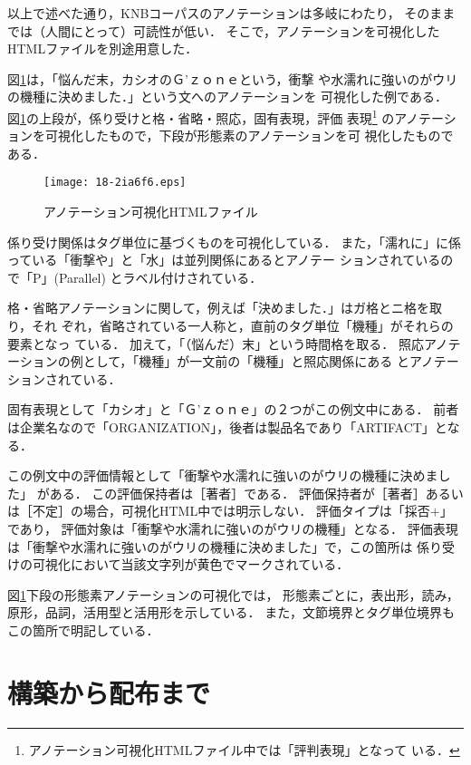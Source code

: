 \documentclass[japanese]{jnlp_JS2.0}
\begin{document}
以上で述べた通り，KNBコーパスのアノテーションは多岐にわたり，
そのままでは（人間にとって）可読性が低い．
そこで，アノテーションを可視化したHTMLファイルを別途用意した．

図\ref{fig:visualize}は，「悩んだ末，カシオのＧ’ｚｏｎｅという，衝撃
や水濡れに強いのがウリの機種に決めました．」という文へのアノテーションを
可視化した例である．
図\ref{fig:visualize}の上段が，係り受けと格・省略・照応，固有表現，評価
表現\footnote{アノテーション可視化HTMLファイル中では「評判表現」となって
いる．} のアノテーションを可視化したもので，下段が形態素のアノテーションを可
視化したものである．

\begin{figure}[t]
\begin{center}
\texttt{[image: 18-2ia6f6.eps]}
\end{center}
\caption{アノテーション可視化HTMLファイル}
\label{fig:visualize}
\end{figure}

係り受け関係はタグ単位に基づくものを可視化している．
また，「濡れに」に係っている「衝撃や」と「水」は並列関係にあるとアノテー
ションされているので「P」(Parallel) とラベル付けされている．

格・省略アノテーションに関して，例えば「決めました．」はガ格とニ格を取り，それ
ぞれ，省略されている一人称と，直前のタグ単位「機種」がそれらの要素となっ
ている．
加えて，「（悩んだ）末」という時間格を取る．
照応アノテーションの例として，「機種」が一文前の「機種」と照応関係にある
とアノテーションされている．

固有表現として「カシオ」と「Ｇ’ｚｏｎｅ」の２つがこの例文中にある．
前者は企業名なので「ORGANIZATION」，後者は製品名であり「ARTIFACT」となる．

この例文中の評価情報として「衝撃や水濡れに強いのがウリの機種に決めました」
がある．
この評価保持者は［著者］である．
評価保持者が［著者］あるいは［不定］の場合，可視化HTML中では明示しない．
評価タイプは「採否$+$」であり，
評価対象は「衝撃や水濡れに強いのがウリの機種」となる．
評価表現は「衝撃や水濡れに強いのがウリの機種に決めました」で，この箇所は
係り受けの可視化において当該文字列が黄色でマークされている．

図\ref{fig:visualize}下段の形態素アノテーションの可視化では，
形態素ごとに，表出形，読み，原形，品詞，活用型と活用形を示している．
また，文節境界とタグ単位境界もこの箇所で明記している．



\section{構築から配布まで \label{sec:construction}}
\end{document}
